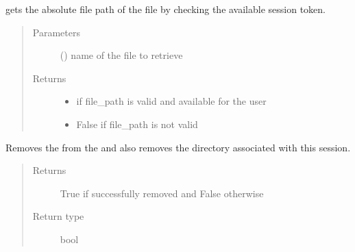 \documentclass[letterpaper,10pt,english,openany,oneside]{sphinxmanual}
\begin{document}
\begin{fulllineitems}
\label{\detokenize{docs/source/application.controllers:application.controllers.file_actions.get_audio_file_path}}
gets the absolute file path of the file by checking the available session token.
\begin{quote}\begin{description}
\item[{Parameters}] \leavevmode
{} () \textendash{} name of the file to retrieve

\item[{Returns}] \leavevmode
\begin{itemize}
\item {} 
 \textendash{} if file\_path is valid and available for the user

\item {} 
 \textendash{} False if file\_path is not valid

\end{itemize}


\end{description}\end{quote}

\end{fulllineitems}


\begin{fulllineitems}
\label{\detokenize{docs/source/application.controllers:application.controllers.file_actions.remove_session_token}}
Removes the  from the 
and also removes the directory associated with this session.
\begin{quote}\begin{description}
\item[{Returns}] \leavevmode
True if successfully removed and False otherwise

\item[{Return type}] \leavevmode
bool

\end{description}\end{quote}

\end{fulllineitems}
\end{document}
